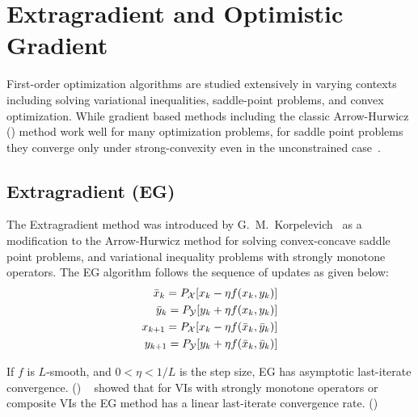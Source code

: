 \section{Extragradient and Optimistic Gradient}
First-order optimization algorithms are studied extensively in varying contexts including solving
variational inequalities, saddle-point problems, and convex optimization.
While gradient based methods including the classic Arrow-Hurwicz () method
work well for many optimization problems, for saddle point problems they converge only under
strong-convexity even in the unconstrained case~\cite{heConvergence2022}.

\subsection{Extragradient (EG)}
The Extragradient method was introduced by G.~M.~Korpelevich~\cite{korpelevichextragradient1976} as
a modification to the Arrow-Hurwicz method for solving convex-concave saddle point problems, and
variational inequality problems with strongly monotone operators.
The EG algorithm follows the sequence of updates as given below: %
\begin{equation}
	\label{eqn:eg}
	\begin{split}
		\bar{x}_{k} = P_{\mathcal{X}}[x_k - \eta f(x_k, y_k)] \\ 
		\bar{y}_{k} = P_{\mathcal{Y}}[y_k + \eta f(x_k, y_k)] \\ 
		x_{k+1} = P_{\mathcal{X}}[x_k - \eta f(\bar{x}_k, \bar{y}_k)] \\ 
		y_{k+1} = P_{\mathcal{Y}}[y_k + \eta f(\bar{x}_k, \bar{y}_k)]
	\end{split}
\end{equation}

If $f$ is $L$-smooth, and $0 < \eta < 1/L$ is the step size, EG has asymptotic
last-iterate convergence.
()
~\cite{tsenglinear1995} showed that for VIs with strongly monotone operators
or composite VIs the EG method has a linear last-iterate convergence rate.
()

